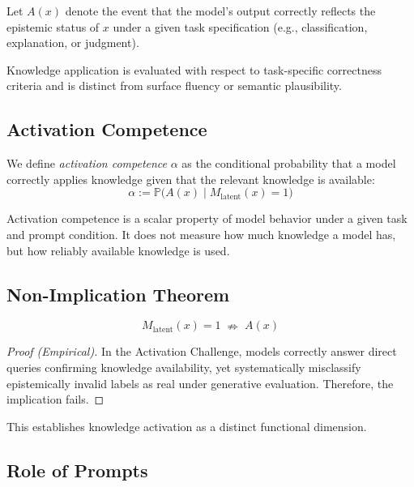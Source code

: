 \begin{definition}
Let $A(x)$ denote the event that the model's output correctly reflects the epistemic status of $x$ under a given task specification (e.g., classification, explanation, or judgment).
\end{definition}

Knowledge application is evaluated with respect to task-specific correctness criteria and is distinct from surface fluency or semantic plausibility.


\subsection{Activation Competence}

\begin{definition}
We define \emph{activation competence} $\alpha$ as the conditional probability that a model correctly applies knowledge given that the relevant knowledge is available:
\begin{equation}
\boxed{\alpha := \mathbb{P}\big(A(x) \mid M_{\text{latent}}(x) = 1\big)}
\end{equation}
\end{definition}

Activation competence is a scalar property of model behavior under a given task and prompt condition. It does not measure how much knowledge a model has, but how reliably available knowledge is used.


\subsection{Non-Implication Theorem}

\begin{theorem}
\[
M_{\text{latent}}(x) = 1 \;\nRightarrow\; A(x)
\]
\end{theorem}

\begin{proof}[Proof (Empirical)]
In the Activation Challenge, models correctly answer direct queries confirming knowledge availability, yet systematically misclassify epistemically invalid labels as real under generative evaluation. Therefore, the implication fails.
\end{proof}

This establishes knowledge activation as a distinct functional dimension.


\subsection{Role of Prompts}

